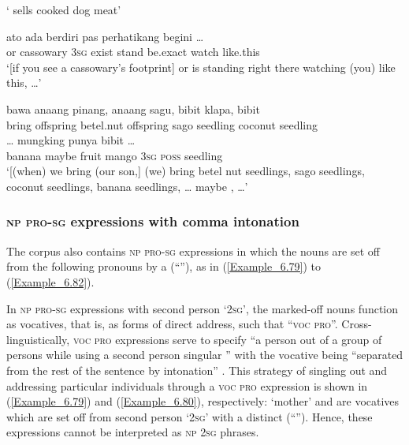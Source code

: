 \glt
‘ sells cooked dog meat’ \textstyleExampleSource{[081011-022-Cv.0105]}
\z

\ea
\label{Example_6.77}
\gll {\ldots} {ato} {} {} {ada} {berdiri} {pas} {perhatikang} {begini} {\ldots}\\ %
 { }   or  cassowary  \textsc{3sg}  exist  stand  be.exact  watch  like.this  \\

\glt
‘[if you see a cassowary’s footprint] or  is standing right there watching (you) like this, {\ldots}’ \textstyleExampleSource{[080923-014-CvEx.0022]}
\z

\ea
\label{Example_6.78}
\gll {\ldots} {{bawa}} {{anaang}} {{pinang,}} {{anaang}} {{sagu,}} {{bibit}} {klapa,} {{bibit}}\\ %
  { } {bring}  {offspring}  {betel.nut}  {offspring}  {sago}  {seedling}  coconut  {seedling}\\
   {\ldots}  {mungking}  {}  {}  {}  punya  {bibit}  {\ldots}\\
 {banana}  {}  {maybe}  {fruit}  {mango}  {\textsc{3sg}}  \textsc{poss}  {seedling}  \\
 ‘[(when) we bring (our son,] (we) bring betel nut seedlings, sago seedlings, coconut seedlings, banana seedlings, {\ldots} maybe , {\ldots}’ \textstyleExampleSource{[081110-005-CvPr.0056-0057]}
\z


\subsubsection[\textsc{np} \textsc{pro-sg} expressions with {comma intonation}]{\textsc{np} \textsc{pro-sg} expressions with comma intonation}
\label{Para_6.2.1.3}
The corpus also contains \textsc{np} \textsc{pro-sg} expressions in which the nouns are set off from the following pronouns by a  (“{\textbar}”), as in (\ref{Example_6.79}) to (\ref{Example_6.82}).



In \textsc{np} \textsc{pro-sg} expressions with second person  ‘\textsc{2sg}’, the marked-off nouns function as vocatives, that is, as forms of direct address, such that ``\textsc{voc} \textsc{pro}''. Cross-linguistically, \textsc{voc} \textsc{pro} expressions serve to specify “a person out of a group of persons while using a second person singular ” with the vocative  being “separated from the rest of the sentence by intonation” \citep[46]{Bhat.2007}. This strategy of singling out and addressing particular individuals through a \textsc{voc} \textsc{pro} expression is shown in (\ref{Example_6.79}) and (\ref{Example_6.80}), respectively:  ‘mother’ and  are vocatives which are set off from second person  ‘2\textsc{sg}’ with a distinct  (“{\textbar}”). Hence, these expressions cannot be interpreted as \textsc{np} \textsc{2sg}  phrases.



